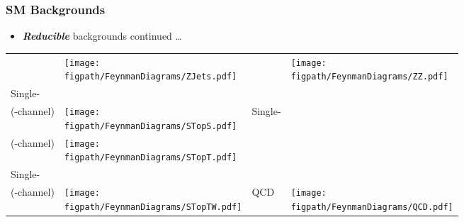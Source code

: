 \begin{frame}
	\frametitle{SM Backgrounds}
	\vspace*{-0.24cm}
	\begin{itemize}
		\item \textit{\textbf{Reducible}} backgrounds continued \ldots
	\end{itemize}
	\begin{table}[tb]
		\centering
		\begin{tabular}{>{\centering}m{} >{\centering}m{} | >{\centering}m{} >{\centering\arraybackslash}m{}}
			\Zjets & \texttt{[image: \\figpath/FeynmanDiagrams/ZJets.pdf]} & \ZZ & \texttt{[image: \\figpath/FeynmanDiagrams/ZZ.pdf]} \\
			Single-\cPqt\\(\cPqs-channel) & \texttt{[image: \\figpath/FeynmanDiagrams/STopS.pdf]} & Single-\cPqt\\(\cPqt-channel) & \texttt{[image: \\figpath/FeynmanDiagrams/STopT.pdf]} \\
			Single-\cPqt\\(\cPqt\PW-channel) & \texttt{[image: \\figpath/FeynmanDiagrams/STopTW.pdf]} & QCD & \texttt{[image: \\figpath/FeynmanDiagrams/QCD.pdf]}\\
		\end{tabular}
	\end{table}
\end{frame}